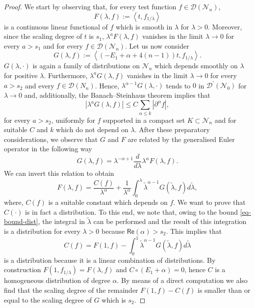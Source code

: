 \documentclass[11pt]{book}
\newcommand{\com}[1]{{\color{red}\bf #1}}
\renewcommand{\Re}{\mathsf{Re}}
\newcommand{\Dcal}{\mathcal{D}}
\newcommand{\Ncal}{\mathcal{N}}
\theoremstyle{break}
\begin{document}
\com{
\begin{proof}
We start by observing that, for every test function $f\in\Dcal(\Ncal_n)$, 
\[
F(\lambda, f) := \left\langle t, f_{1/\lambda} \right\rangle
\] 
is a continuous linear functional of $f$ which is smooth in $\lambda$ for $\lambda>0$. Moreover, since the scaling degree of $t$ is $s_1$, $\lambda^{a}F(\lambda, f)$ vanishes in the limit $\lambda \to 0$ for every $a > s_1$ and for every $f\in\Dcal(\Ncal_n)$.
Let us now consider 
\[
G(\lambda, f)  :=  \left\langle(-E_1+\alpha+4(n-1))t, f_{1/\lambda}\right\rangle. 
\]
$G(\lambda, \cdot)$ is again a family of distributions on $\Ncal_n$ which depends smoothly on $\lambda$ for positive $\lambda$. Furthermore, $\lambda^{a}G(\lambda, f)$ vanishes in the limit $\lambda\to 0$ for every $a > s_2$ and every $f\in\Dcal(N_n)$. Hence,  
$\lambda^{\alpha-1} G(\lambda, \cdot)$ tends to $0$ in $\Dcal^\prime(\Ncal_0)$ for $\lambda\to 0$ and, additionally, the Banach--Steinhaus theorem implies that 
\begin{equation}\label{eq-bound-dist}
\left| \lambda^{a} G(\lambda,f) \right|  \leq C \sum_{\alpha\leq k} |\partial^{\alpha} f|,
\end{equation}
for every $a>s_2$, uniformly for $f$ supported in a compact set $K\subset \Ncal_n$ and for suitable $C$ and $k$ which do not depend on $\lambda$.
%
After these preparatory considerations, we observe that $G$ and $F$ are related by the generalised Euler operator in the following way
\[
G(\lambda, f) =  \lambda^{-\alpha+1} \frac{d}{d\lambda} \lambda^{\alpha} F(\lambda, f).
\]
We can invert this relation to obtain
\[
F(\lambda, f) =  \frac{C(f)}{\lambda^{\alpha}} + \frac{1}{\lambda^\alpha} \int_0^\lambda  \tilde{\lambda}^{\alpha-1} G(\tilde{\lambda}, f) d\tilde{\lambda},
\]
where, $C(f)$ is a suitable constant which depends on $f$. We want to prove that $C(\cdot)$ is in fact a distribution. To this end, we note that, owing to the bound \eqref{eq-bound-dist}, the integral in $\tilde\lambda$ can be performed and the result of this integration is a distribution for every $\lambda > 0$ because $\Re(\alpha) > s_2$.  
This implies that 
\[
C(f) = F(1, f)  - \int_0^1  \tilde{\lambda}^{\alpha-1} G(\tilde{\lambda}, f) d\tilde{\lambda}
\]
is a distribution because it is a linear combination of distributions. By construction $F(1,f_{1/\lambda})=F(\lambda,f)$ and $C\circ (E_1+\alpha) =0$, hence $C$ is a homogeneous distribution of degree $\alpha$. By means of a direct computation we also find that the scaling degree of the remainder $F(1,f)-C(f)$ is smaller than or equal to the scaling degree of $G$ which is $s_2$.
\end{proof}
}
\end{document}
